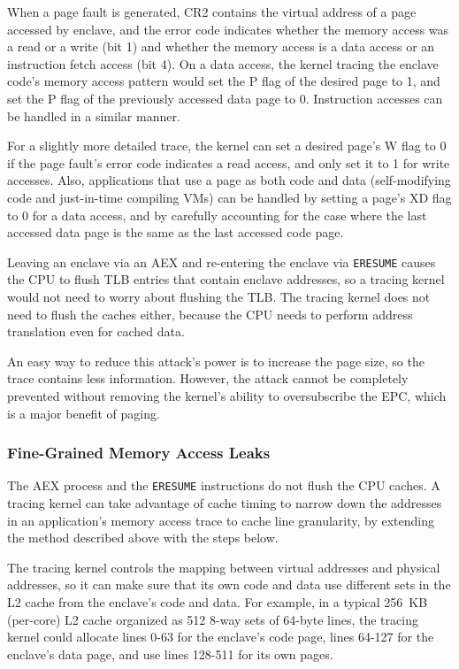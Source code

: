 When a page fault is generated, CR2 contains the virtual address of a page
accessed by enclave, and the error code indicates whether the memory access was
a read or a write (bit 1) and whether the memory access is a data access or
an instruction fetch access (bit 4). On a data access, the kernel tracing the
enclave code's memory access pattern would set the P flag of the desired page
to 1, and set the P flag of the previously accessed data page to 0. Instruction
accesses can be handled in a similar manner.

For a slightly more detailed trace, the kernel can set a desired page's W flag
to 0 if the page fault's error code indicates a read access, and only set it to
1 for write accesses. Also, applications that use a page as both code and data
(self-modifying code and just-in-time compiling VMs) can be handled by setting
a page's XD flag to 0 for a data access, and by carefully accounting for the
case where the last accessed data page is the same as the last accessed code
page.

Leaving an enclave via an AEX and re-entering the enclave via \texttt{ERESUME}
causes the CPU to flush TLB entries that contain enclave addresses, so a
tracing kernel would not need to worry about flushing the TLB. The tracing
kernel does not need to flush the caches either, because the CPU needs to
perform address translation even for cached data.

An easy way to reduce this attack's power is to increase the page size, so the
trace contains less information. However, the attack cannot be completely
prevented without removing the kernel's ability to oversubscribe the EPC,
which is a major benefit of paging.

\subsubsection{Fine-Grained Memory Access Leaks}

The AEX process and the \texttt{ERESUME} instructions do not flush the CPU
caches. A tracing kernel can take advantage of cache timing to narrow down
the addresses in an application's memory access trace to cache line
granularity, by extending the method described above with the steps below.

The tracing kernel controls the mapping between virtual addresses and physical
addresses, so it can make sure that its own code and data use different sets
in the L2 cache from the enclave's code and data. For example, in a typical
256~KB (per-core) L2 cache organized as 512 8-way sets of 64-byte lines, the
tracing kernel could allocate lines 0-63 for the enclave's code page, lines
64-127 for the enclave's data page, and use lines 128-511 for its own pages.

